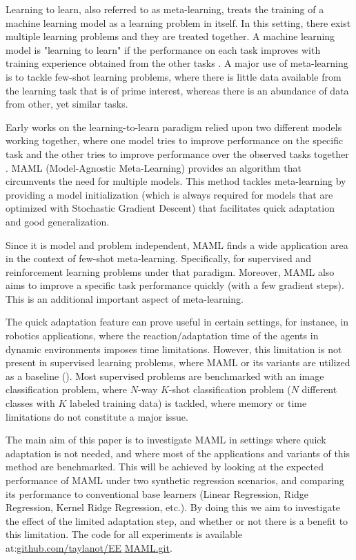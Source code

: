 Learning to learn, also referred to as meta-learning, treats the training of a machine learning model as a learning problem in itself. In this setting, there exist multiple learning problems and they are treated together. A machine learning model is "learning to learn" if the performance on each task improves with training experience obtained from the other tasks \cite{thrun1998}. A major use of meta-learning is to tackle few-shot learning problems, where there is little data available from the learning task that is of prime interest, whereas there is an abundance of data from other, yet similar tasks. 

Early works on the learning-to-learn paradigm relied upon two different models working together, where one model tries to improve performance on the specific task and the other tries to improve performance over the observed tasks together \cite{thrun1998}. MAML (Model-Agnostic Meta-Learning) \cite{finn2017} provides an algorithm that circumvents the need for multiple models. This method tackles meta-learning by providing a model initialization (which is always required for models that are optimized with Stochastic Gradient Descent) that facilitates quick adaptation and good generalization.

Since it is model and problem independent, MAML finds a wide application area in the context of few-shot meta-learning. Specifically, for supervised and reinforcement learning problems under that paradigm. Moreover, MAML also aims to improve a specific task performance quickly (with a few gradient steps). This is an additional important aspect of meta-learning. 


The quick adaptation feature can prove useful in certain settings, for instance, in robotics applications, where the reaction/adaptation time of the agents in dynamic environments imposes time limitations. However, this limitation is not present in supervised learning problems, where MAML or its variants are utilized as a baseline (\eg \cite{flennerhag2019,nichol2018,rajasegaran2020,collins2020,guiroy2019}). Most supervised problems are benchmarked with an image classification problem, where $N$-way $K$-shot classification problem ($N$ different classes with $K$ labeled training data) is tackled, where memory or time limitations do not constitute a major issue.

The main aim of this paper is to investigate MAML in settings where quick adaptation is not needed, and where most of the applications and variants of this method are benchmarked. This will be achieved by looking at the expected performance of MAML under two synthetic regression scenarios, and comparing its performance to conventional base learners (\eg Linear Regression, Ridge Regression, Kernel Ridge Regression, etc.). By doing this we aim to investigate the effect of the limited adaptation step, and whether or not there is a benefit to this limitation. The code for all experiments is available at:\href{https://github.com/taylanot/EE_MAML.git}{github.com/taylanot/EE$\_$MAML.git}. 
